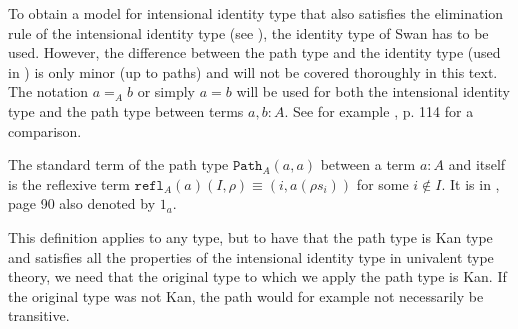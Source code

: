 \documentclass[11pt,a4paper,twoside,xetex,draft]{book}
\newcommand{\op}[1]{\mathtt{#1}}
\begin{document}
To obtain a model for intensional identity type that also satisfies the elimination rule of the intensional identity type (see \label{pathindprop}), the identity type of Swan has to be used. However, the difference between the path type and the identity type (used in \cite{Swan2014}) is only minor (up to paths) and will not be covered thoroughly in this text. The notation $a =_A b$ or simply $a = b$ will be used for both the intensional identity type and the path type between terms $a, b: A$. See for example \cite{Huber2016}, p. 114 for a comparison. 

The standard term of the path type $\op{Path}_A(a,a)$ between a term $a : A$ and itself  is the reflexive term $\op{refl}_A(a)(I,\rho) \equiv (i, a(\rho s_i))$ for some $i \not \in I$. It is in \cite{Huber2016}, page 90 also denoted by $1_a$.

This definition applies to any type, but to have that the path type is Kan type and satisfies all the properties of the intensional identity type in univalent type theory, we need that the original type to which we apply the path type is Kan. If the original type was not Kan, the path would for example not necessarily be transitive. 
\end{document}
